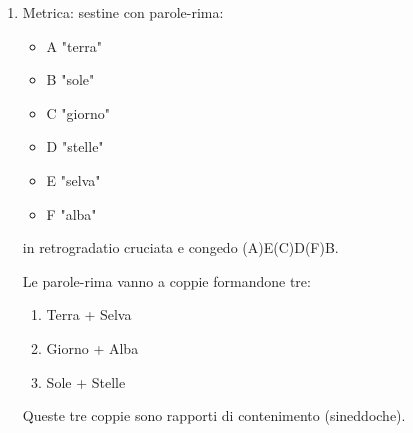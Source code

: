 \documentclass{article}
\begin{document}
\begin{enumerate}
    \item Metrica: sestine con parole-rima:
        \begin{itemize}
            \item A "terra"
            \item B "sole"
            \item C "giorno"
            \item D "stelle"
            \item E "selva"
            \item F "alba"
        \end{itemize}
        in retrogradatio cruciata e congedo (A)E(C)D(F)B.

    Le parole-rima vanno a coppie formandone tre:
        \begin{enumerate}
            \item Terra + Selva
            \item Giorno + Alba
            \item Sole + Stelle
        \end{enumerate}
    Queste tre coppie sono rapporti di contenimento (sineddoche).


\end{enumerate}
\end{document}
